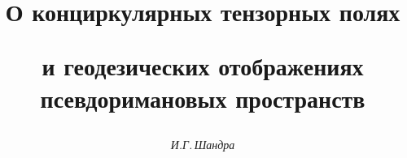 




% 





\newcommand{\la}{\langle}


\newcommand{\ra}{\rangle}


\newcommand{\const}{\operatorname{const}}


\newcommand{\tts}[1]{}







\setcounter{page}{55}















\author{\it И.Г.\,Шандра}




\title{О конциркулярных тензорных полях


и геодезических отображениях псевдоримановых пространств}





\date{}




\pagestyle{plain} %







\maketitle


